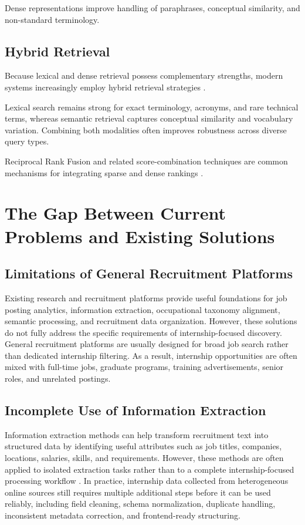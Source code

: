 Dense representations improve handling of paraphrases, conceptual similarity, and non-standard terminology.

\subsection{Hybrid Retrieval}

Because lexical and dense retrieval possess complementary strengths, modern systems increasingly employ hybrid retrieval strategies \cite{bruch2023analysis}.

Lexical search remains strong for exact terminology, acronyms, and rare technical terms, whereas semantic retrieval captures conceptual similarity and vocabulary variation. Combining both modalities often improves robustness across diverse query types.

Reciprocal Rank Fusion and related score-combination techniques are common mechanisms for integrating sparse and dense rankings \cite{cormack2009reciprocal, bruch2023analysis}.

\section{The Gap Between Current Problems and Existing Solutions}

\subsection{Limitations of General Recruitment Platforms}

Existing research and recruitment platforms provide useful foundations for job posting analytics, information extraction, occupational taxonomy alignment, semantic processing, and recruitment data organization. However, these solutions do not fully address the specific requirements of internship-focused discovery. General recruitment platforms are usually designed for broad job search rather than dedicated internship filtering. As a result, internship opportunities are often mixed with full-time jobs, graduate programs, training advertisements, senior roles, and unrelated postings.

\subsection{Incomplete Use of Information Extraction}

Information extraction methods can help transform recruitment text into structured data by identifying useful attributes such as job titles, companies, locations, salaries, skills, and requirements. However, these methods are often applied to isolated extraction tasks rather than to a complete internship-focused processing workflow \cite{li2020survey, wadden2019entity}. In practice, internship data collected from heterogeneous online sources still requires multiple additional steps before it can be used reliably, including field cleaning, schema normalization, duplicate handling, inconsistent metadata correction, and frontend-ready structuring.

